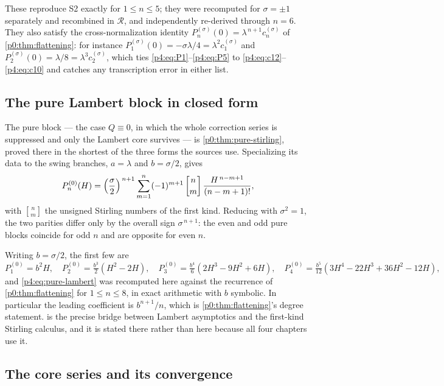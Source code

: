 \documentclass[11pt,a4paper,oneside]{book}
\theoremstyle{plain}
\theoremstyle{definition}
\theoremstyle{remark}
\newcommand{\stirlingfirst}[2]{\genfrac{[}{]}{0pt}{}{#1}{#2}}
\begin{document}
These reproduce \textsf{S2} exactly for $1\le n\le5$; they were recomputed for
$\sigma=\pm1$ separately and recombined in $\mathscr R$, and independently
re-derived through $n=6$.  They also satisfy the cross-normalization identity
$P^{(\sigma)}_n(0)=\lambda^{\,n+1}c^{(\sigma)}_n$ of \cref{p0:thm:flattening}:
for instance $P^{(\sigma)}_1(0)=-\sigma\lambda/4=\lambda^{2}c^{(\sigma)}_1$ and
$P^{(\sigma)}_2(0)=\lambda/8=\lambda^{3}c^{(\sigma)}_2$, which ties
\cref{p4:eq:P1}--\cref{p4:eq:P5} to \cref{p4:eq:c12}--\cref{p4:eq:c10} and
catches any transcription error in either list.

\subsection{The pure Lambert block in closed form}

The pure block --- the case $Q\equiv0$, in which the whole correction series
is suppressed and only the Lambert core survives --- is
\cref{p0:thm:pure-stirling}, proved there in the shortest of the three forms
the sources use.  Specializing its data to the swing branches, $a=\lambda$ and
$b=\sigma/2$, gives
\begin{equation}
  P^{(0)}_n(H)=\Bigl(\frac{\sigma}{2}\Bigr)^{\,n+1}
  \sum_{m=1}^{n}(-1)^{m+1}\,\stirlingfirst{n}{m}\,
  \frac{H^{\,n-m+1}}{(n-m+1)!},
  \label{p4:eq:pure-lambert}
\end{equation}
with $\stirlingfirst{n}{m}$ the unsigned Stirling numbers of the first kind.
Reducing with $\sigma^{2}=1$, the two parities differ only by the overall sign
$\sigma^{\,n+1}$: the even and odd pure blocks coincide for odd $n$ and are
opposite for even $n$.

Writing $b=\sigma/2$, the first few are
\[
  P^{(0)}_1=b^{2}H,\quad
  P^{(0)}_2=\tfrac{b^{3}}2(H^{2}-2H),\quad
  P^{(0)}_3=\tfrac{b^{4}}6(2H^{3}-9H^{2}+6H),\quad
  P^{(0)}_4=\tfrac{b^{5}}{12}(3H^{4}-22H^{3}+36H^{2}-12H),
\]
and \cref{p4:eq:pure-lambert} was recomputed here against the recurrence of
\cref{p0:thm:flattening} for $1\le n\le8$, in exact arithmetic with $b$
symbolic.  In particular the leading
coefficient is $b^{n+1}/n$, which is \cref{p0:thm:flattening}'s degree
statement.   is the precise bridge between Lambert
asymptotics and the first-kind Stirling calculus, and it is stated there
rather than here because all four chapters use it.

\subsection{The core series and its convergence}
\end{document}
